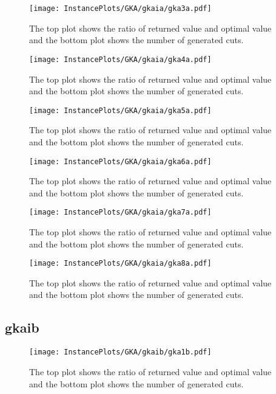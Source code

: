 \documentclass[10pt,a4paper]{article}
\begin{document}
\begin{figure}[H]
\texttt{[image: InstancePlots/GKA/gkaia/gka3a.pdf]}
\caption{The top plot shows the ratio of returned value and optimal value     and the bottom plot shows the number of generated cuts.}
\end{figure}

\begin{figure}[H]
\texttt{[image: InstancePlots/GKA/gkaia/gka4a.pdf]}
\caption{The top plot shows the ratio of returned value and optimal value     and the bottom plot shows the number of generated cuts.}
\end{figure}

\begin{figure}[H]
\texttt{[image: InstancePlots/GKA/gkaia/gka5a.pdf]}
\caption{The top plot shows the ratio of returned value and optimal value     and the bottom plot shows the number of generated cuts.}
\end{figure}

\begin{figure}[H]
\texttt{[image: InstancePlots/GKA/gkaia/gka6a.pdf]}
\caption{The top plot shows the ratio of returned value and optimal value     and the bottom plot shows the number of generated cuts.}
\end{figure}

\begin{figure}[H]
\texttt{[image: InstancePlots/GKA/gkaia/gka7a.pdf]}
\caption{The top plot shows the ratio of returned value and optimal value     and the bottom plot shows the number of generated cuts.}
\end{figure}

\begin{figure}[H]
\texttt{[image: InstancePlots/GKA/gkaia/gka8a.pdf]}
\caption{The top plot shows the ratio of returned value and optimal value     and the bottom plot shows the number of generated cuts.}
\end{figure}

\subsection{gkaib}
\begin{figure}[H]
\texttt{[image: InstancePlots/GKA/gkaib/gka1b.pdf]}
\caption{The top plot shows the ratio of returned value and optimal value     and the bottom plot shows the number of generated cuts.}
\end{figure}
\end{document}

